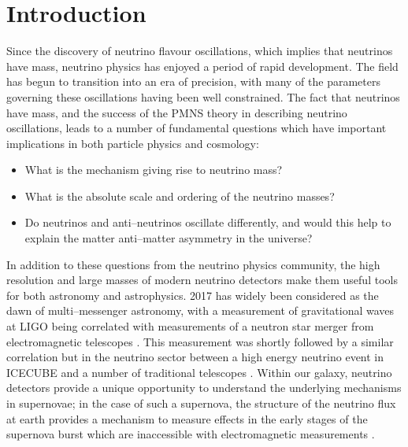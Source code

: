 \chapter{\label{ch:1-intro}Introduction} 

\minitoc

Since the discovery of neutrino flavour oscillations, which implies that
neutrinos have mass, neutrino physics has enjoyed a period of rapid development.
The field has begun to transition into an era of precision, with many of the
parameters governing these oscillations having been well constrained. The fact
that neutrinos have mass, and the success of the PMNS theory in describing
neutrino oscillations, leads to a number of fundamental questions which have
important implications in both particle physics and cosmology: 

\begin{itemize}
	\item What is the mechanism giving rise to neutrino mass? 
	\item What is the absolute scale and ordering of the neutrino masses?
	\item Do neutrinos and anti--neutrinos oscillate differently, and would this 
	      help to explain the matter anti--matter asymmetry in the universe?
\end{itemize}

In addition to these questions from the neutrino physics community, the high
resolution and large masses of modern neutrino detectors make them useful tools
for both astronomy and astrophysics. 2017 has widely been considered as the dawn
of multi--messenger astronomy, with a measurement of gravitational waves at LIGO
being correlated with measurements of a neutron star merger from electromagnetic
telescopes \cite{Abbott2017}. This measurement was shortly followed by a similar
correlation but in the neutrino sector between a high energy neutrino event in
ICECUBE and a number of traditional telescopes \cite{Aartsen2018}. Within our
galaxy, neutrino detectors provide a unique opportunity to understand the
underlying mechanisms in supernovae; in the case of such a supernova, the
structure of the neutrino flux at earth provides a mechanism to measure effects
in the early stages of the supernova burst which are inaccessible with
electromagnetic measurements \cite{Scholberg:2012id}.

